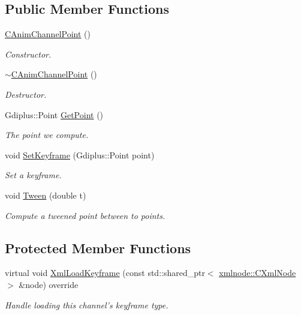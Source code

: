 \subsection*{Public Member Functions}
\begin{DoxyCompactItemize}
\item 
\hypertarget{class_c_anim_channel_point_ac887ebf37797918e29197cd855eb3d60}{\hyperlink{class_c_anim_channel_point_ac887ebf37797918e29197cd855eb3d60}{C\+Anim\+Channel\+Point} ()}\label{class_c_anim_channel_point_ac887ebf37797918e29197cd855eb3d60}

\begin{DoxyCompactList}\small\item\em Constructor. \end{DoxyCompactList}\item 
\hypertarget{class_c_anim_channel_point_ac0ffdb24903c2ae673686d53b2e1dadb}{\hyperlink{class_c_anim_channel_point_ac0ffdb24903c2ae673686d53b2e1dadb}{$\sim$\+C\+Anim\+Channel\+Point} ()}\label{class_c_anim_channel_point_ac0ffdb24903c2ae673686d53b2e1dadb}

\begin{DoxyCompactList}\small\item\em Destructor. \end{DoxyCompactList}\item 
Gdiplus\+::\+Point \hyperlink{class_c_anim_channel_point_a8885cd8eb06b4af6d9997e7d79c1d856}{Get\+Point} ()
\begin{DoxyCompactList}\small\item\em The point we compute. \end{DoxyCompactList}\item 
void \hyperlink{class_c_anim_channel_point_abcfdddd770020c17e5736ccf6bb15912}{Set\+Keyframe} (Gdiplus\+::\+Point point)
\begin{DoxyCompactList}\small\item\em Set a keyframe. \end{DoxyCompactList}\item 
void \hyperlink{class_c_anim_channel_point_ac67b18d31453f8e25c681423c3e056c8}{Tween} (double t)
\begin{DoxyCompactList}\small\item\em Compute a tweened point between to points. \end{DoxyCompactList}\end{DoxyCompactItemize}
\subsection*{Protected Member Functions}
\begin{DoxyCompactItemize}
\item 
virtual void \hyperlink{class_c_anim_channel_point_a7eb61594e08c2f0177f086bc3af9221f}{Xml\+Load\+Keyframe} (const std\+::shared\+\_\+ptr$<$ \hyperlink{classxmlnode_1_1_c_xml_node}{xmlnode\+::\+C\+Xml\+Node} $>$ \&node) override
\begin{DoxyCompactList}\small\item\em Handle loading this channel's keyframe type. \end{DoxyCompactList}\end{DoxyCompactItemize}


